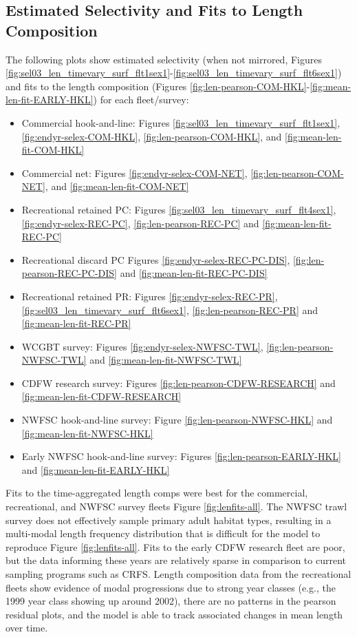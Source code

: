 \documentclass[
  english,
  a4paper,
]{article}
\providecommand{\tightlist}{%
  \setlength{\itemsep}{0pt}\setlength{\parskip}{0pt}}
\begin{document}
\hypertarget{estimated-selectivity-and-fits-to-length-composition}{%
\subsection{Estimated Selectivity and Fits to Length Composition}\label{estimated-selectivity-and-fits-to-length-composition}}

The following plots show estimated selectivity (when not mirrored, Figures \ref{fig:sel03_len_timevary_surf_flt1sex1}-\ref{fig:sel03_len_timevary_surf_flt6sex1}) and fits to the length composition (Figures \ref{fig:len-pearson-COM-HKL}-\ref{fig:mean-len-fit-EARLY-HKL}) for each fleet/survey:

\begin{itemize}
\tightlist
\item
  Commercial hook-and-line: Figures \ref{fig:sel03_len_timevary_surf_flt1sex1},
  \ref{fig:endyr-selex-COM-HKL}, \ref{fig:len-pearson-COM-HKL}, and \ref{fig:mean-len-fit-COM-HKL}
\item
  Commercial net: Figures \ref{fig:endyr-selex-COM-NET}, \ref{fig:len-pearson-COM-NET}, and \ref{fig:mean-len-fit-COM-NET}
\item
  Recreational retained PC: Figures \ref{fig:sel03_len_timevary_surf_flt4sex1}, \ref{fig:endyr-selex-REC-PC}, \ref{fig:len-pearson-REC-PC} and \ref{fig:mean-len-fit-REC-PC}
\item
  Recreational discard PC Figures \ref{fig:endyr-selex-REC-PC-DIS}, \ref{fig:len-pearson-REC-PC-DIS} and \ref{fig:mean-len-fit-REC-PC-DIS}
\item
  Recreational retained PR: Figures \ref{fig:endyr-selex-REC-PR}, \ref{fig:sel03_len_timevary_surf_flt6sex1}, \ref{fig:len-pearson-REC-PR} and \ref{fig:mean-len-fit-REC-PR}
\item
  WCGBT survey: Figures \ref{fig:endyr-selex-NWFSC-TWL}, \ref{fig:len-pearson-NWFSC-TWL} and \ref{fig:mean-len-fit-NWFSC-TWL}
\item
  CDFW research survey: Figures \ref{fig:len-pearson-CDFW-RESEARCH} and \ref{fig:mean-len-fit-CDFW-RESEARCH}
\item
  NWFSC hook-and-line survey: Figure \ref{fig:len-pearson-NWFSC-HKL} and \ref{fig:mean-len-fit-NWFSC-HKL}
\item
  Early NWFSC hook-and-line survey: Figures \ref{fig:len-pearson-EARLY-HKL} and \ref{fig:mean-len-fit-EARLY-HKL}
\end{itemize}

Fits to the time-aggregated length comps were best for the commercial, recreational, and NWFSC survey fleets Figure \ref{fig:lenfits-all}. The NWFSC trawl survey does not effectively sample primary adult habitat types, resulting in a multi-modal length frequency distribution that is difficult for the model to reproduce Figure \ref{fig:lenfits-all}. Fits to the early CDFW research fleet are poor, but the data informing these years are relatively sparse in comparison to current sampling programs such as CRFS. Length composition data from the recreational fleets show evidence of modal progressions due to strong year classes (e.g., the 1999 year class showing up around 2002), there are no patterns in the pearson residual plots, and the model is able to track associated changes in mean length over time.
\end{document}
